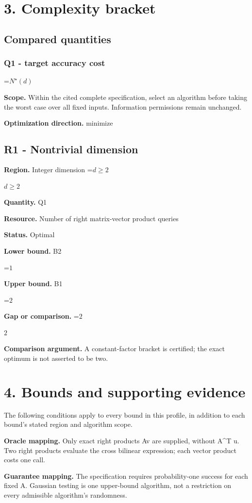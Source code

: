 \documentclass[10pt,a4paper]{article}
\newcommand{\AtlasMath}[1]{\par\begingroup\centering\setbox0=\hbox{$\displaystyle #1$}\ifdim\wd0>1.4\linewidth\typeout{ATLAS WIDE FORMULA: \the\wd0}\fi\ifdim\wd0>\linewidth\resizebox{\linewidth}{!}{\box0}\else\box0\fi\par\endgroup}
\newcommand{\AtlasInlineMath}[1]{\begingroup\setbox0=\hbox{$#1$}\ifdim\wd0>.4\linewidth\endgroup\AtlasMath{#1}\else\endgroup$#1$\fi}
\begin{document}
\section{3. Complexity bracket}
\subsection{Compared quantities}
\subsubsection{Q1 - target accuracy cost}
\AtlasMath{N^\star(d)}
\textbf{Scope.} Within the cited complete specification, select an algorithm before taking the worst case over all fixed inputs. Information permissions remain unchanged.

\textbf{Optimization direction.} minimize

\subsection{R1 - Nontrivial dimension}
\textbf{Region.} Integer dimension \AtlasInlineMath{d\ge2}

\textbf{Quantity.} Q1

\textbf{Resource.} Number of right matrix-vector product queries

\textbf{Status.} Optimal

\textbf{Lower bound.} B2

\AtlasMath{1}
\textbf{Upper bound.} B1

\AtlasMath{2}
\textbf{Gap or comparison.} \AtlasInlineMath{2}

\textbf{Comparison argument.} A constant-factor bracket is certified; the exact optimum is not asserted to be two.

\section{4. Bounds and supporting evidence}
The following conditions apply to every bound in this profile, in addition to each bound's stated region and algorithm scope.

\textbf{Oracle mapping.} Only exact right products Av are supplied, without A\textasciicircum{}T u. Two right products evaluate the cross bilinear expression; each vector product costs one call.

\textbf{Guarantee mapping.} The specification requires probability-one success for each fixed A. Gaussian testing is one upper-bound algorithm, not a restriction on every admissible algorithm's randomness.
\end{document}
